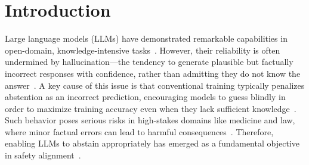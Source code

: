 \documentclass{article} %
\newcommand{\framename}{\textsc{KARL}}
\begin{document}
\section{Introduction}
Large language models (LLMs) have demonstrated remarkable capabilities in open-domain, knowledge-intensive tasks~\citep{openai_gpt5_2025,deepmind_gemini3pro_2025,Deepseek-r1}. However, their reliability is often undermined by hallucination---the tendency to generate plausible but factually incorrect responses with confidence, rather than admitting they do not know the answer~\citep{OnFaithfulnessandFactuality,hallusurvey}. A key cause of this issue is that conventional training typically penalizes abstention as an incorrect prediction, encouraging models to guess blindly in order to maximize training accuracy even when they lack sufficient knowledge~\citep{OpenaiHallucination}. Such behavior poses serious risks in high-stakes domains like medicine and law, where minor factual errors can lead to harmful consequences~\citep{lawformer,Large_Legal_Fictions,Hallucination-Free,Medical}. Therefore, enabling LLMs to abstain appropriately has emerged as a fundamental objective in safety alignment~\citep{wen2024Knowyourlimits}. 






\end{document}
